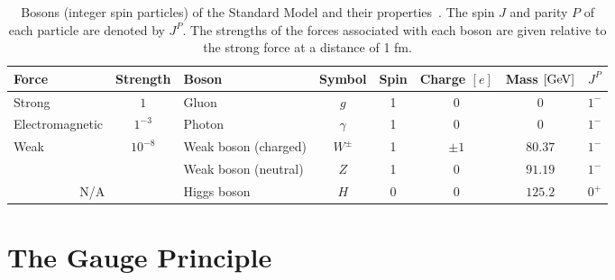 \begin{table}[h]
	\centering
	\caption{Bosons (integer spin particles) of the Standard Model and their properties~\cite{ParticleDataGroup}.
		The spin $J$ and parity $P$ of each particle are denoted by $J^P$. The strengths of the forces associated with each boson are given relative to the strong force at a distance of 1 \unit{\femto\metre}.}
	\begin{adjustbox}{max width=\textwidth}
		\label{tab:bosons}
		\renewcommand{\arraystretch}{1.5}
		\begin{tabular}{lclccccc}
			\toprule
			\hline
			Force                   & Strength                   & Boson                & Symbol   & Spin & Charge $[e]$ & Mass $[\GeV]$ & $J^P$ \\
			\hline
			Strong                  & $1$                        & Gluon                & $g$      & 1    & 0            & 0             & $1^-$ \\
			Electromagnetic         & $1^{-3}$                   & Photon               & $\gamma$ & 1    & 0            & 0             & $1^-$ \\
			\multirow{2}{*}{Weak}   & \multirow{2}{*}{$10^{-8}$} & Weak boson (charged) & $W^\pm$  & 1    & $\pm 1$      & $80.37$       & $1^-$ \\
			                        &                            & Weak boson (neutral) & $Z$      & 1    & 0            & $91.19$       & $1^-$ \\
			\hline
			\multicolumn{2}{c}{N/A} & Higgs boson                & $H$                  & 0        & 0    & $125.2$      & $0^+$                 \\
			\hline
		\end{tabular}
	\end{adjustbox}
\end{table}

\section{The Gauge Principle}
\label{sec:gauge_principle}

